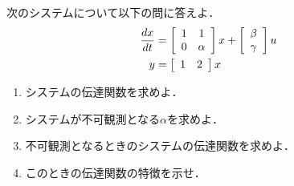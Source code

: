 \item
次のシステムについて以下の問に答えよ．
\begin{align}
	\frac{dx}{dt}
	&=	\bmatrix{cc}
			1 & 1 \\
			0 & \alpha
		\ematrix
		x
		+
		\bmatrix{c}
			\beta \\
			\gamma
		\ematrix
		u
\nonumber \\
	y 
	&=	\bmatrix{cc}
			1 & 2 
		\ematrix
		x
\nonumber 
\end{align}

\begin{enumerate}

\item 
システムの伝達関数を求めよ．
\vspace{8cm}

\item
システムが不可観測となる$\alpha$を求めよ．
\vspace{8cm}

\item
不可観測となるときのシステムの伝達関数を求めよ．
\vspace{3cm}

\item
このときの伝達関数の特徴を示せ．
\vspace{3cm}

\end{enumerate}
